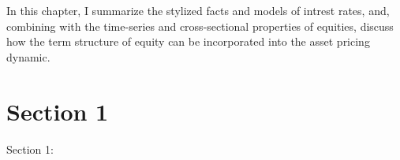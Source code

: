 \minitoc

\vspace{0.5cm}

In this chapter, I summarize the stylized facts and models of intrest rates, 
and, combining with the time-series and cross-sectional properties of equities, 
discuss how the term structure of equity can be incorporated into the asset pricing
dynamic.

\section{Section 1}
Section 1: